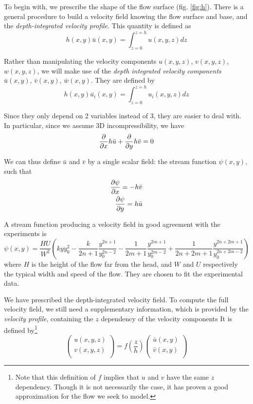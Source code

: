 To begin with, we prescribe the shape of the flow surface (fig. \ref{fig:h}). 
There is a general procedure to build a velocity field knowing the flow surface and base, and the \textit{depth-integrated velocity profile}. This quantity is defined as 
\begin{equation}
h(x,y) \bar{u}(x,y) = \int_{z=0}^{z=h} u(x, y, z) dz
\end{equation}

Rather than manipulating the velocity components $u(x,y,z)$, $v(x,y,z)$, $w(x,y,z)$, we will make use of the \textit{depth integrated velocity components} $\bar{u}(x,y)$, $\bar{v}(x,y)$, $\bar{w}(x,y)$. They are defined by
\begin{equation}
h(x,y) \bar{u_i}(x,y) = \int_{z=0}^{z=h} u_i(x, y, z) dz
\end{equation}

Since they only depend on 2 variables instead of 3, they are easier to deal with. In particular, since we assume 3D incompressibility, we have
\begin{equation}
\frac{\partial {}}{\partial {x}} h \bar u + \frac{\partial {}}{\partial {y}} h \bar v = 0
\end{equation}

We can thus define $\bar u$ and $\bar v$ by a single scalar field: the stream function $\psi(x,y)$, such that
\begin{align}
\frac{\partial {\psi}}{\partial {x}} = - h \bar v \\
\frac{\partial {\psi}}{\partial {y}} = h \bar u
\end{align}

A stream function producing a velocity field in good agreement with the experiments is
\begin{equation}
\psi(x, y) = \frac{H U}{W^2} \left( k y y_0^2 - \frac{k}{2n + 1} \frac{y^{2n+1}}{y_0^{2n-2}} - \frac{1}{2m+1} \frac{y^{2m+1}}{y_0^{2m-2}} + \frac{1}{2n+2m+1} \frac{y^{2n+2m+1}}{y_0^{2n+2m-2}} \right)
\end{equation}
where $H$ is the height of the flow far from the head,  and $W$ and $U$ respectively the typical width and speed of the flow. They are chosen to fit the experimental data.

We have prescribed the depth-integrated velocity field. To compute the full velocity field, we still need a supplementary information, which is provided by the \textit{velocity profile}, containing the $z$ dependency of the velocity components  
It is defined by\footnote{Note that this definition of $f$ implies that $u$ and $v$ have the same $z$ dependency. Though it is not necessarily the case, it has proven a good approximation for the flow we seek to model.}
\begin{equation}
	\begin{pmatrix}
	u(x, y, z)\\
	v(x, y, z)\\
\end{pmatrix}
=
f \left( \frac{z}{h} \right)
\begin{pmatrix}
	\bar u(x, y) \\
	\bar v(x, y) \\
\end{pmatrix}
\end{equation}

